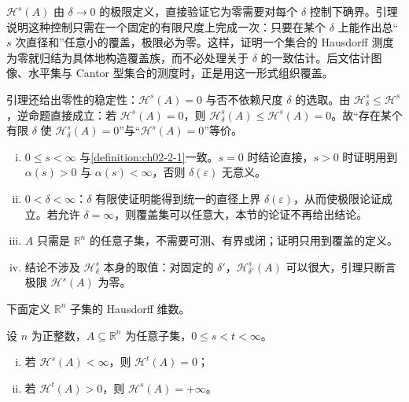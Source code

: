 \documentclass[../../main.tex]{subfiles}%
\begin{document}
\begin{remark}\label{remark:ch02-lem-2-1-动机}
$\mathcal{H}^s(A)$ 由 $\delta\to0$ 的极限定义，直接验证它为零需要对每个 $\delta$ 控制下确界。引理说明这种控制只需在一个固定的有限尺度上完成一次：只要在某个 $\delta$ 上能作出总“$s$ 次直径和”任意小的覆盖，极限必为零。这样，证明一个集合的 Hausdorff 测度为零就归结为具体地构造覆盖族，而不必处理关于 $\delta$ 的一致估计。后文估计图像、水平集与 Cantor 型集合的测度时，正是用这一形式组织覆盖。

引理还给出零性的稳定性：$\mathcal{H}^s(A)=0$ 与否不依赖尺度 $\delta$ 的选取。由 $\mathcal{H}^s_\delta\leqslant\mathcal{H}^s$，逆命题直接成立：若 $\mathcal{H}^s(A)=0$，则 $\mathcal{H}^s_\delta(A)\leqslant\mathcal{H}^s(A)=0$。故“存在某个有限 $\delta$ 使 $\mathcal{H}^s_\delta(A)=0$”与“$\mathcal{H}^s(A)=0$”等价。
\end{remark}

\begin{remark}\label{remark:ch02-lem-2-1-条件}
\begin{enumerate}[(i)]
\item $0\leqslant s<\infty$ 与\cref{definition:ch02-2-1}一致。$s=0$ 时结论直接，$s>0$ 时证明用到 $\alpha(s)>0$ 与 $\alpha(s)<\infty$，否则 $\delta(\varepsilon)$ 无意义。%
\item $0<\delta<\infty$：$\delta$ 有限使证明能得到统一的直径上界 $\delta(\varepsilon)$，从而使极限论证成立。若允许 $\delta=\infty$，则覆盖集可以任意大，本节的论证不再给出结论。
\item $A$ 只需是 $\mathbb{R}^n$ 的任意子集，不需要可测、有界或闭；证明只用到覆盖的定义。
\item 结论不涉及 $\mathcal{H}^s_\delta$ 本身的取值：对固定的 $\delta'$，$\mathcal{H}^s_{\delta'}(A)$ 可以很大，引理只断言极限 $\mathcal{H}^s(A)$ 为零。
\end{enumerate}
\end{remark}

下面定义 $\mathbb{R}^n$ 子集的 Hausdorff 维数。

\begin{lemma}\label{lemma:ch02-2-2}
设 $n$ 为正整数，$A\subseteq\mathbb{R}^n$ 为任意子集，$0\leqslant s<t<\infty$。
\begin{enumerate}[(i)]
\item 若 $\mathcal{H}^s(A)<\infty$，则 $\mathcal{H}^t(A)=0$；
\item 若 $\mathcal{H}^t(A)>0$，则 $\mathcal{H}^s(A)=+\infty$。
\end{enumerate}
\end{lemma}
\end{document}
